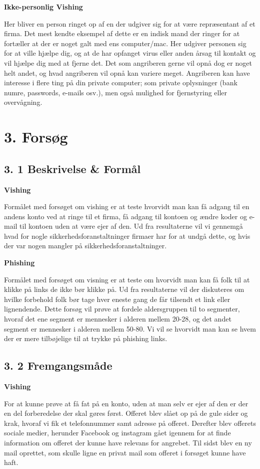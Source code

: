 \documentclass[11pt]{report}
\begin{document}
\noindent\textbf{Ikke-personlig Vishing}
\par Her bliver en person ringet op af en der udgiver sig for at være repræsentant af et firma. Det mest kendte eksempel af dette er en indisk mand der ringer for at fortæller at der er noget galt med ens computer/mac. Her udgiver personen sig for at ville hjælpe dig, og at de har opfanget virus eller anden årsag til kontakt og vil hjælpe dig med at fjerne det. Det som angriberen gerne vil opnå dog er noget helt andet, og hvad angriberen vil opnå kan variere meget. Angriberen kan have interesse i flere ting på din private computer; som private oplysninger (bank numre, passwords, e-mails osv.), men også mulighed for fjernstyring eller overvågning. 
\chapter*{3. Forsøg}

\section*{3. 1 Beskrivelse \& Formål}
\noindent\textbf{Vishing}
\par Formålet med forsøget om vishing er at teste hvorvidt man kan få adgang til en andens konto ved at ringe til et firma, få adgang til kontoen og ændre koder og e-mail til kontoen uden at være ejer af den. Ud fra resultaterne vil vi gennemgå hvad for nogle sikkerhedsforanstaltninger firmaer har for at undgå dette, og hvis der var nogen mangler på sikkerhedsforanstaltninger.


\noindent\textbf{Phishing}
\par Formålet med forsøget om visning er at teste om hvorvidt man kan få folk til at klikke på links de ikke bør klikke på. Ud fra resultaterne vil der diskuteres om hvilke forbehold folk bør tage hver eneste gang de får tilsendt et link eller lignendende. Dette forsøg vil prøve at fordele aldersgruppen til to segmenter, hvoraf det ene segment er mennesker i alderen mellem 20-28, og det andet segment er mennesker i alderen mellem 50-80. Vi vil se hvorvidt man kan se hvem der er mere tilbøjelige til at trykke på phishing links. 

\section*{3. 2 Fremgangsmåde}
\noindent\textbf{Vishing}
\par For at kunne prøve at få fat på en konto, uden at man selv er ejer af den er der en del forberedelse der skal gøres først. Offeret blev slået op på de gule sider og krak, hvoraf vi fik et telefonnummer samt adresse på offeret. Derefter blev offerets sociale medier, herunder Facebook og instagram gået igennem for at finde information om offeret der kunne have relevans for angrebet. Til sidst blev en ny mail oprettet, som skulle ligne en privat mail som offeret i forsøget kunne have haft.
\end{document}
